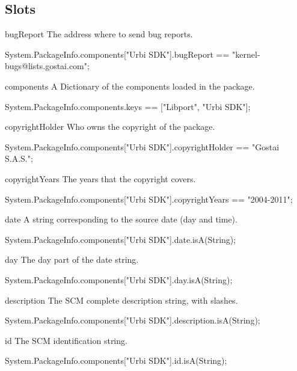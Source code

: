 \subsection{Slots}
\begin{urbiscriptapi}
\item[bugReport] The address where to send bug reports.
\begin{urbiassert}
System.PackageInfo.components["Urbi SDK"].bugReport
  == "kernel-bugs@lists.gostai.com";
\end{urbiassert}

\item[components] A Dictionary of the components loaded in the package.
\begin{urbiassert}
System.PackageInfo.components.keys == ["Libport", "Urbi SDK"];
\end{urbiassert}

\item[copyrightHolder] Who owns the copyright of the package.
\begin{urbiassert}
System.PackageInfo.components["Urbi SDK"].copyrightHolder
  == "Gostai S.A.S.";
\end{urbiassert}

\item[copyrightYears] The years that the copyright covers.
\begin{urbiassert}
System.PackageInfo.components["Urbi SDK"].copyrightYears
  == "2004-2011";
\end{urbiassert}

\item[date] A string corresponding to the source date (day and time).
\begin{urbiassert}
System.PackageInfo.components["Urbi SDK"].date.isA(String);
\end{urbiassert}

\item[day] The day part of the date string.
\begin{urbiassert}
System.PackageInfo.components["Urbi SDK"].day.isA(String);
\end{urbiassert}

\item[description] The SCM complete description string, with slashes.
\begin{urbiassert}
System.PackageInfo.components["Urbi SDK"].description.isA(String);
\end{urbiassert}

\item[id] The SCM identification string.
\begin{urbiassert}
System.PackageInfo.components["Urbi SDK"].id.isA(String);
\end{urbiassert}


\end{urbiscriptapi}
